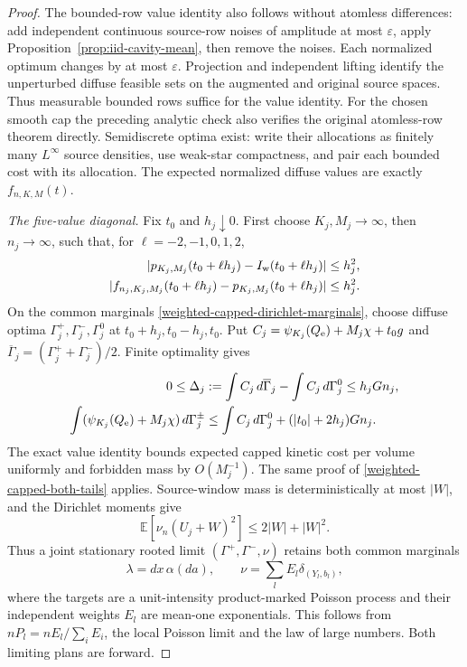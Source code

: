 \documentclass[11pt,reqno]{amsart}
\theoremstyle{definition}
\theoremstyle{remark}
\numberwithin{equation}{section}
\newcommand{\E}{\mathbb E}
\begin{document}
\begin{proof}
The bounded-row value identity also follows without atomless differences:
add independent continuous source-row noises of amplitude at most
\(\varepsilon\), apply Proposition~\ref{prop:iid-cavity-mean}, then
remove the noises. Each normalized optimum changes by at most
\(\varepsilon\). Projection and independent lifting identify the
unperturbed diffuse feasible sets on the augmented and original source
spaces. Thus measurable bounded rows suffice for the value identity.
For the chosen smooth cap the preceding analytic check also verifies
the original atomless-row theorem directly. Semidiscrete optima exist:
write their allocations as finitely many \(L^\infty\) source densities,
use weak-star compactness, and pair each bounded cost with its allocation.
The expected normalized diffuse values are exactly \(f_{n,K,M}(t)\).

\emph{The five-value diagonal.}
Fix \(t_0\) and \(h_j\downarrow0\). First choose
\(K_j,M_j\to\infty\), then \(n_j\to\infty\), such that, for
\(\ell=-2,-1,0,1,2\),
\begin{equation}
\label{weighted-capped-five-values}
 \begin{split}
 |p_{K_j,M_j}(t_0+\ell h_j)-I_{\rm w}(t_0+\ell h_j)|&\le h_j^2,\\
 |f_{n_j,K_j,M_j}(t_0+\ell h_j)-p_{K_j,M_j}(t_0+\ell h_j)|
                                                    &\le h_j^2.
 \end{split}
\end{equation}
On the common marginals \eqref{weighted-capped-dirichlet-marginals},
choose diffuse optima \(\Gamma_j^+,\Gamma_j^-,\Gamma_j^0\) at
\(t_0+h_j,t_0-h_j,t_0\). Put
\(C_j=\psi_{K_j}(Q_{\rm e})+M_j\chi+t_0g\) and
\(\overline\Gamma_j=(\Gamma_j^++\Gamma_j^-)/2\). Finite
optimality gives
\begin{equation}
\label{weighted-capped-diffuse-excess}
 \begin{split}
 0\le\Delta_j
  &:=\int C_j\,d\overline\Gamma_j-\int C_j\,d\Gamma_j^0
                                                    \le h_jGn_j,\\
 \int(\psi_{K_j}(Q_{\rm e})+M_j\chi)\,d\Gamma_j^\pm
  &\le\int C_j\,d\Gamma_j^0+(|t_0|+2h_j)Gn_j.
 \end{split}
\end{equation}
The exact value identity bounds expected capped kinetic cost per volume
uniformly and forbidden mass by \(O(M_j^{-1})\). The same proof of
\eqref{weighted-capped-both-tails} applies. Source-window mass is
deterministically at most \(|W|\), and the Dirichlet moments give
\[
                  \E[\nu_n(U_j+W)^2]\le2|W|+|W|^2.
\]
Thus a joint stationary rooted limit \((\Gamma^+,\Gamma^-,\nu)\)
retains both common marginals
\begin{equation}
\label{weighted-capped-diffuse-marginals}
 \lambda=dx\,\alpha(da),\qquad
 \nu=\sum_l E_l\delta_{(Y_l,b_l)},
\end{equation}
where the targets are a unit-intensity product-marked Poisson process
and their independent weights \(E_l\) are mean-one exponentials.
This follows from \(nP_l=nE_l/\sum_iE_i\), the local Poisson limit
and the law of large numbers. Both limiting plans are forward.


\end{proof}
\end{document}
